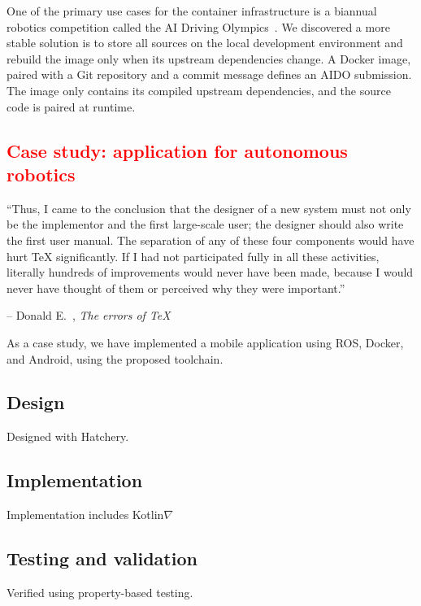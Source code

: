 \documentclass[12pt,initial,twoside,maitrise]{dms}
\newcommand{\rare}[1]{\textcolor{red}{#1}}
\numberwithin{equation}{section}
\numberwithin{table}{chapter}
\numberwithin{figure}{chapter}
\begin{document}
One of the primary use cases for the container infrastructure is a biannual robotics competition called the AI Driving Olympics~\citep{aido2018}. We discovered a more stable solution is to store all sources on the local development environment and rebuild the image only when its upstream dependencies change. A Docker image, paired with a Git repository and a commit message defines an AIDO submission. The image only contains its compiled upstream dependencies, and the source code is paired at runtime.

\rare{\chapter{Case study: application for autonomous robotics}\label{ch:case-study}}

\setlength{\epigraphwidth}{0.80\textwidth}
\epigraph{``Thus, I came to the conclusion that the designer of a new system must not only be the implementor and the first large-scale user; the designer should also write the first user manual. The separation of any of these four components would have hurt TeX significantly. If I had not participated fully in all these activities, literally hundreds of improvements would never have been made, because I would never have thought of them or perceived why they were important.''}{\begin{flushright}-- Donald E.~\citet{knutherrors}, \textit{The errors of TeX}\end{flushright}}

As a case study, we have implemented a mobile application using ROS, Docker, and Android, using the proposed toolchain.

\section{Design}

Designed with Hatchery.

\section{Implementation}

Implementation includes Kotlin$\nabla$

\section{Testing and validation}

Verified using property-based testing.
\end{document}
